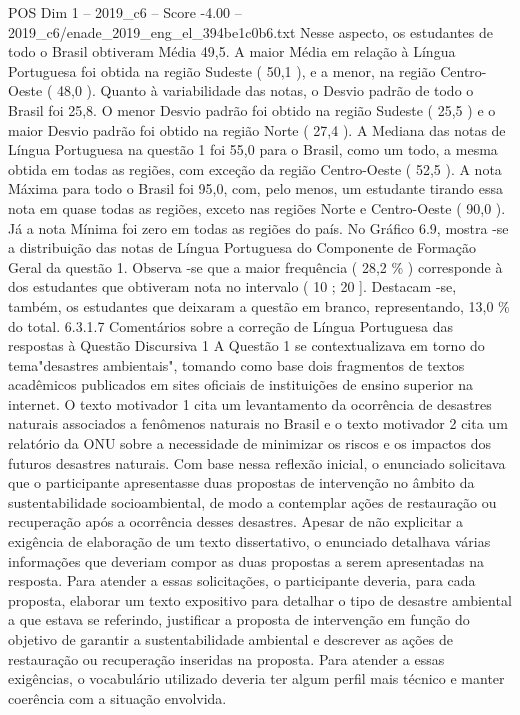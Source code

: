 \begin{textsample}{POS Dim 1 – 2019\_c6 – Score -4.00 – 2019\_c6/enade\_2019\_eng\_el\_394be1c0b6.txt}
Nesse aspecto, os estudantes de todo o Brasil obtiveram Média 49,5.
A maior Média em relação à Língua Portuguesa foi obtida na região Sudeste ( 50,1 ), e a menor, na região Centro-Oeste ( 48,0 ).
Quanto à variabilidade das notas, o Desvio padrão de todo o Brasil foi 25,8.
O menor Desvio padrão foi obtido na região Sudeste ( 25,5 ) e o maior Desvio padrão foi obtido na região Norte ( 27,4 ).
A Mediana das notas de Língua Portuguesa na questão 1 foi 55,0 para o Brasil, como um todo, a mesma obtida em todas as regiões, com exceção da região Centro-Oeste ( 52,5 ).
A nota Máxima para todo o Brasil foi 95,0, com, pelo menos, um estudante tirando essa nota em quase todas as regiões, exceto nas regiões Norte e Centro-Oeste ( 90,0 ).
Já a nota Mínima foi zero em todas as regiões do país.
No Gráfico 6.9, mostra -se a distribuição das notas de Língua Portuguesa do Componente de Formação Geral da questão 1.
Observa -se que a maior frequência ( 28,2 \% ) corresponde à dos estudantes que obtiveram nota no intervalo ( 10 ; 20 ].
Destacam -se, também, os estudantes que deixaram a questão em branco, representando, 13,0 \% do total. 6.3.1.7 Comentários sobre a correção de Língua Portuguesa das respostas à Questão Discursiva 1 A Questão 1 se contextualizava em torno do tema"desastres ambientais", tomando como base dois fragmentos de textos acadêmicos publicados em sites oficiais de instituições de ensino superior na internet.
O texto motivador 1 cita um levantamento da ocorrência de desastres naturais associados a fenômenos naturais no Brasil e o texto motivador 2 cita um relatório da ONU sobre a necessidade de minimizar os riscos e os impactos dos futuros desastres naturais.
Com base nessa reflexão inicial, o enunciado solicitava que o participante apresentasse duas propostas de intervenção no âmbito da sustentabilidade socioambiental, de modo a contemplar ações de restauração ou recuperação após a ocorrência desses desastres.
Apesar de não explicitar a exigência de elaboração de um texto dissertativo, o enunciado detalhava várias informações que deveriam compor as duas propostas a serem apresentadas na resposta.
Para atender a essas solicitações, o participante deveria, para cada proposta, elaborar um texto expositivo para detalhar o tipo de desastre ambiental a que estava se referindo, justificar a proposta de intervenção em função do objetivo de garantir a sustentabilidade ambiental e descrever as ações de restauração ou recuperação inseridas na proposta.
Para atender a essas exigências, o vocabulário utilizado deveria ter algum perfil mais técnico e manter coerência com a situação envolvida.

\end{textsample}
